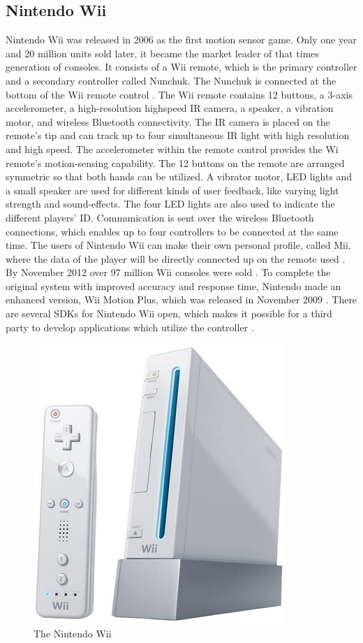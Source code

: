 \subsection{Nintendo Wii}
Nintendo Wii was released in 2006 as the first motion sensor game. Only one year and 20 million units sold later, it became the market leader of that times generation of consoles. It consists of a Wii remote, which is the primary controller and a secondary controller called Nunchuk. The Nunchuk is connected at the bottom of the Wii remote control \cite{hackingwii}. The Wii remote contains 12 buttons, a 3-axis accelerometer, a high-resolution highspeed IR camera, a speaker, a vibration motor, and wireless Bluetooth connectivity.
The IR camera is placed on the remote's tip and can track up to four simultaneous IR light with high resolution and high speed. The accelerometer within the remote control provides the Wi remote’s motion-sensing capability. The 12 buttons on the remote are arranged symmetric so that both hands can be utilized. A vibrator motor, LED lights and a small speaker are used for different kinds of user feedback, like varying light strength and sound-effects. The four LED lights are also used to indicate the different players' ID. Communication is sent over the wireless Bluetooth connections, which enables up to four controllers to be connected at the same time.  The users of Nintendo Wii can make their own personal profile, called Mii, where the data of the player will be directly connected up on the remote used  \cite{hackingwii} \cite{whatiswii}. By November 2012 over 97 million Wii consoles were sold \cite{vgchartzhardware}.  To complete the original system with improved accuracy and response time, Nintendo made an enhanced version, Wii Motion Plus, which was released in November 2009 \cite{consoles}. There are several SDKs for Nintendo Wii open, which makes it possible for a third party to develop applications which utilize the controller \cite{comparison}. 
\begin{figure}[h!]
\begin{center}
\includegraphics[scale=0.3]{nintendowii}
\caption[Nitendo Wii]{The Nintendo Wii}
\label{fig:NintendoWii}
\end{center}
\end{figure}

